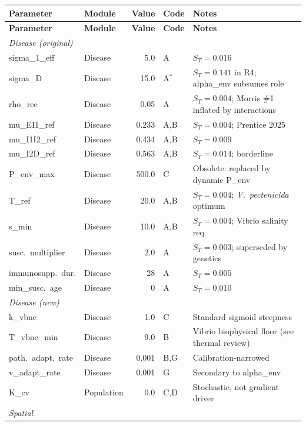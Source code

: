 \documentclass[11pt,a4paper]{article}
\begin{document}
\begin{footnotesize}
\begin{longtable}{llrlp{5.5cm}}
\toprule
\textbf{Parameter} & \textbf{Module} & \textbf{Value} & \textbf{Code} & \textbf{Notes} \\
\midrule
\endfirsthead
\toprule
\textbf{Parameter} & \textbf{Module} & \textbf{Value} & \textbf{Code} & \textbf{Notes} \\
\midrule
\endhead
\multicolumn{5}{l}{\textit{Disease (original)}} \\
\midrule
sigma\_1\_eff & Disease & 5.0 & A & $S_T = 0.016$ \\
sigma\_D & Disease & 15.0 & A$^*$ & $S_T = 0.141$ in R4; alpha\_env subsumes role \\
rho\_rec & Disease & 0.05 & A & $S_T = 0.004$; Morris \#1 inflated by interactions \\
mu\_EI1\_ref & Disease & 0.233 & A,B & $S_T = 0.004$; Prentice 2025 \\
mu\_I1I2\_ref & Disease & 0.434 & A,B & $S_T = 0.009$ \\
mu\_I2D\_ref & Disease & 0.563 & A,B & $S_T = 0.014$; borderline \\
P\_env\_max & Disease & 500.0 & C & Obsolete: replaced by dynamic P\_env \\
T\_ref & Disease & 20.0 & A,B & $S_T = 0.004$; \textit{V.\ pectenicida} optimum \\
s\_min & Disease & 10.0 & A,B & $S_T = 0.004$; Vibrio salinity req. \\
susc.\ multiplier & Disease & 2.0 & A & $S_T = 0.003$; superseded by genetics \\
immunosupp.\ dur. & Disease & 28 & A & $S_T = 0.005$ \\
min\_susc.\ age & Disease & 0 & A & $S_T = 0.010$ \\
\midrule
\multicolumn{5}{l}{\textit{Disease (new)}} \\
\midrule
k\_vbnc & Disease & 1.0 & C & Standard sigmoid steepness \\
T\_vbnc\_min & Disease & 9.0 & B & Vibrio biophysical floor (see thermal review) \\
path.\ adapt.\ rate & Disease & 0.001 & B,G & Calibration-narrowed \\
v\_adapt\_rate & Disease & 0.001 & G & Secondary to alpha\_env \\
K\_cv & Population & 0.0 & C,D & Stochastic, not gradient driver \\
\midrule
\multicolumn{5}{l}{\textit{Spatial}} \\

\end{longtable}
\end{footnotesize}
\end{document}

